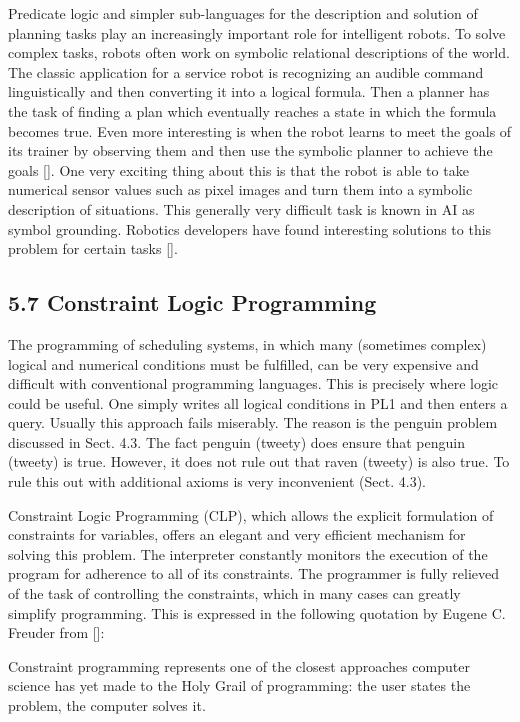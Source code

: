 \documentclass[10pt]{article}
\begin{document}
Predicate logic and simpler sub-languages for the description and solution of planning tasks play an increasingly important role for intelligent robots. To solve complex tasks, robots often work on symbolic relational descriptions of the world. The classic application for a service robot is recognizing an audible command linguistically and then converting it into a logical formula. Then a planner has the task of finding a plan which eventually reaches a state in which the formula becomes true. Even more interesting is when the robot learns to meet the goals of its trainer by observing them and then use the symbolic planner to achieve the goals [\cite{cubek2015high}]. One very exciting thing about this is that the robot is able to take numerical sensor values such as pixel images and turn them into a symbolic description of situations. This generally very difficult task is known in AI as symbol grounding. Robotics developers have found interesting solutions to this problem for certain tasks [\cite{cubek2015critical}].

\subsection*{5.7 Constraint Logic Programming}
The programming of scheduling systems, in which many (sometimes complex) logical and numerical conditions must be fulfilled, can be very expensive and difficult with conventional programming languages. This is precisely where logic could be useful. One simply writes all logical conditions in PL1 and then enters a query. Usually this approach fails miserably. The reason is the penguin problem discussed in Sect. 4.3. The fact penguin (tweety) does ensure that penguin (tweety) is true. However, it does not rule out that raven (tweety) is also true. To rule this out with additional axioms is very inconvenient (Sect. 4.3).

Constraint Logic Programming (CLP), which allows the explicit formulation of constraints for variables, offers an elegant and very efficient mechanism for solving this problem. The interpreter constantly monitors the execution of the program for adherence to all of its constraints. The programmer is fully relieved of the task of controlling the constraints, which in many cases can greatly simplify programming. This is expressed in the following quotation by Eugene C. Freuder from [\cite{freuder1997pursuit}]:


\begin{displayquote}
Constraint programming represents one of the closest approaches computer science has yet made to the Holy Grail of programming: the user states the problem, the computer solves it.
\end{displayquote}
\end{document}
